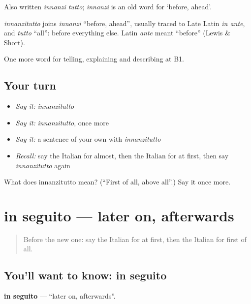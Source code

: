 Also written \emph{innanzi tutto}; \emph{innanzi} is an old word for ‘before, ahead’.

\begin{cousinweb}
\emph{innanzitutto} joins \emph{innanzi} \textquotedblleft{}before, ahead\textquotedblright{}, usually traced to Late Latin \emph{in ante}, and \emph{tutto} \textquotedblleft{}all\textquotedblright{}: before everything else. Latin \emph{ante} meant \textquotedblleft{}before\textquotedblright{} (Lewis \& Short).
\end{cousinweb}

\begin{grammarlens}[title={What you've built}]
One more word for telling, explaining and describing at B1.
\end{grammarlens}

\subsection*{Your turn}
\begin{itemize}
\raggedright
  \item \emph{Say it:} \emph{innanzitutto}
  \item \emph{Say it:} \emph{innanzitutto}, once more
  \item \emph{Say it:} a sentence of your own with \emph{innanzitutto}
  \item \emph{Recall:} say the Italian for almost, then the Italian for at first, then say \emph{innanzitutto} again
\end{itemize}

\begin{tcolorbox}[breakable,colback=teal!4,colframe=teal!35!black,title={Before you move on}]
What does innanzitutto mean? (\textquotedblleft{}First of all, above all\textquotedblright{}.) Say it once more.
\end{tcolorbox}
\section[in seguito]{in seguito — later on, afterwards}

\label{lesson:IT-C273-in-seguito}



\begin{quote}
Before the new one: say the Italian for at first, then the Italian for first of all.
\end{quote}

\subsection*{You'll want to know: in seguito}
\textbf{in seguito} — \textquotedblleft{}later on, afterwards\textquotedblright{}.

